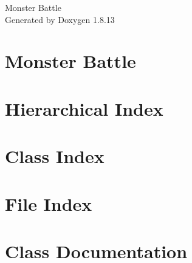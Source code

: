 \documentclass[twoside]{book}
\newcommand{\+}{\discretionary{\mbox{\scriptsize$\hookleftarrow$}}{}{}}
\newcommand{\clearemptydoublepage}{%
  \newpage{\pagestyle{empty}\cleardoublepage}%
}
\begin{document}
\hypersetup{pageanchor=false,
             bookmarksnumbered=true,
             pdfencoding=unicode
            }
\begin{titlepage}
\vspace*{7cm}
\begin{center}%
{\Large Monster Battle }\\
\vspace*{1cm}
{\large Generated by Doxygen 1.8.13}\\
\end{center}
\end{titlepage}
\clearemptydoublepage
{}
\tableofcontents
\clearemptydoublepage
{}
\hypersetup{pageanchor=true}

\chapter{Monster Battle}
\label{md_ReadMe}

\chapter{Hierarchical Index}

\chapter{Class Index}

\chapter{File Index}

\chapter{Class Documentation}



























\end{document}
